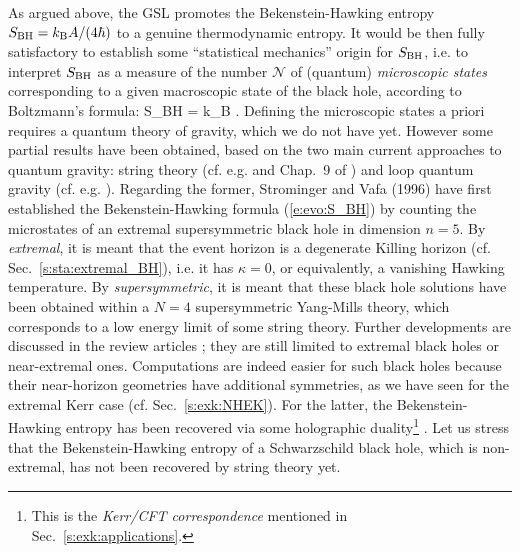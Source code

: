 As argued above, the GSL promotes the Bekenstein-Hawking entropy
$S_{\rm BH} = k_{\rm B} {A}/(4\hbar)$ to a genuine thermodynamic entropy.
It would be then fully satisfactory to
establish some ``statistical mechanics'' origin for $S_{\rm BH}$, i.e. to interpret $S_{\rm BH}$
as a measure of the number $\mathscr{N}$ of (quantum) \emph{microscopic states} corresponding to a given macroscopic
state of the black hole, according to Boltzmann's formula:
\be
    S_{\rm BH} = k_{\rm B} \ln {}.
\ee
Defining the microscopic states a priori requires a quantum theory of gravity, which we do not have yet. However some partial results have been
obtained, based on the two main current approaches to quantum gravity: string theory
(cf. e.g. \cite{Peet01} and Chap.~9 of \cite{GrumiS22})
and loop quantum gravity (cf. e.g. \cite{Perez17,Rovel04}). Regarding the former, Strominger and Vafa (1996) \cite{StromV96} have first established
the Bekenstein-Hawking formula (\ref{e:evo:S_BH}) by counting the microstates
of an extremal supersymmetric black hole in dimension $n=5$. By \emph{extremal}, it is meant
that the event horizon is a degenerate Killing horizon
(cf. Sec.~\ref{s:sta:extremal_BH}), i.e. it has $\kappa=0$, or equivalently,
a vanishing Hawking temperature. By \emph{supersymmetric}, it is meant that these black hole
solutions have been obtained within a $N=4$ supersymmetric Yang-Mills theory,
which corresponds to a low energy limit of some string theory. Further developments are
discussed in the review articles \cite{Carli14,Damou04,Horow98,Wald01,Walla19,Zaffa20}; they are
still limited to extremal black holes or near-extremal ones.
Computations are indeed easier for such black holes because their near-horizon geometries
have additional symmetries, as we have seen for the extremal Kerr case
(cf. Sec.~\ref{s:exk:NHEK}). For the latter, the Bekenstein-Hawking entropy
has been recovered via some
holographic duality\footnote{This is the \emph{Kerr/CFT correspondence}
mentioned in Sec.~\ref{s:exk:applications}.} \cite{GuicaHSS09,Compe17}.
Let us stress that the Bekenstein-Hawking entropy of a Schwarzschild black hole, which is non-extremal,
has not been recovered by string theory yet.

